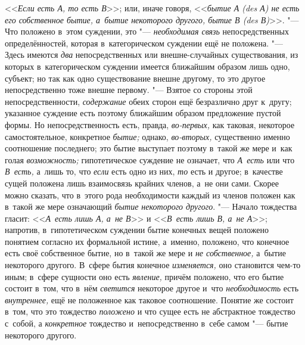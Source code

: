 <<{\em Если есть А, то есть В}>>; или, иначе говоря,
<<{\em бытие А (des А) не есть его
собственное бытие, а~бытие некоторого другого, бытие В (des В)}>>. "---
Что положено в~этом суждении, это "--- {\em необходимая связь}
непосредственных определённостей, которая в~категорическом
суждении ещё не положена. "--- Здесь имеются {\em два}
непосредственных или внешне-случайных существования, из
которых в~категорическом суждении имеется ближайшим образом лишь одно,
субъект; но так как одно существование внешне другому, то это другое
непосредственно тоже внешне первому. "--- Взятое со стороны
этой непосредственности, {\em содержание} обеих
сторон ещё безразлично друг к~другу; указанное суждение есть поэтому
ближайшим образом предложение пустой формы. Но непосредственность есть,
правда, {\em во-первых,} как таковая, некоторое самостоятельное, конкретное
{\em бытие;} однако, {\em во-вторых,}
существенно именно соотношение последнего; это бытие
выступает поэтому в~такой же мере и~как голая {\em возможность;}
гипотетическое суждение не означает, что {\em А~есть} или что
{\em В~есть,} а~лишь то, что {\em если} есть одно из них, {\em то} есть и
другое; в~качестве сущей положена лишь взаимосвязь крайних членов, а~не они
сами. Скорее можно сказать, что в~этого рода необходимости каждый из членов
положен как в~такой же мере означающий {\em бытие некоторого другого}. "---
Начало тождества гласит: <<{\em А~есть лишь А, а~не В}>> и <<{\em В~есть лишь
В, а~не А}>>; напротив, в~гипотетическом суждении бытие конечных
вещей положено понятием согласно их формальной истине, а~именно, положено,
что конечное есть своё собственное бытие, но в~такой же мере и
{\em не собственное,} а~бытие некоторого другого. В~сфере бытия конечное
{\em изменяется,} оно становится чем-то иным; в~сфере сущности оно есть
{\em явление,} причём положено, что его бытие состоит в~том, что в~нём
{\em светится} некоторое другое и~что {\em необходимость} есть
{\em внутреннее,} ещё не положенное как таковое соотношение. Понятие же
состоит в~том, что это тождество {\em положено}
и что сущее есть не абстрактное тождество с~собой, а {\em конкретное}
тождество и~непосредственно в~себе самом "--- бытие некоторого другого.

